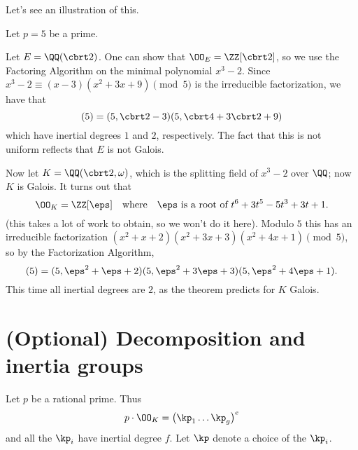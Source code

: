 Let's see an illustration of this.
\begin{example}
	Let $p = 5$ be a prime.
	\begin{enumerate}[(a)]
		\ii Let $E = \QQ(\cbrt2)$.
		One can show that $\OO_E = \ZZ[\cbrt2]$, so
		we use the Factoring Algorithm on the minimal polynomial $x^3-2$.
		Since $x^3-2 \equiv (x-3)(x^2+3x+9) \pmod 5$ is the irreducible factorization,
		we have that
		\[ (5) = (5,\cbrt2-3)(5, \cbrt4+3\cbrt2+9) \]
		which have inertial degrees $1$ and $2$, respectively.
		The fact that this is not uniform reflects that $E$ is not Galois.

		\ii Now let $K = \QQ(\cbrt2,\omega)$, which is the splitting
		field of $x^3-2$ over $\QQ$; now $K$ is Galois.
		It turns out that
		\[ \OO_K = \ZZ[\eps] \quad\text{where}\quad \eps \text { is a root of } t^6+3t^5-5t^3+3t+1. \]
		(this takes a lot of work to obtain, so we won't do it here).
		Modulo $5$ this has an irreducible factorization
		$(x^2+x+2)(x^2+3x+3)(x^2+4x+1) \pmod 5$,
		so by the Factorization Algorithm,
		\[ (5) = (5, \eps^2+\eps+2)(5, \eps^2+3\eps+3)(5, \eps^2+4\eps+1). \]
		This time all inertial degrees are $2$, as the theorem predicts for $K$ Galois.
	\end{enumerate}
\end{example}

\section{(Optional) Decomposition and inertia groups}
Let $p$ be a rational prime.
Thus
\[ p \cdot \OO_K = \left( \kp_1 \dots \kp_g \right)^e \]
and all the $\kp_i$ have inertial degree $f$.
Let $\kp$ denote a choice of the $\kp_i$.

